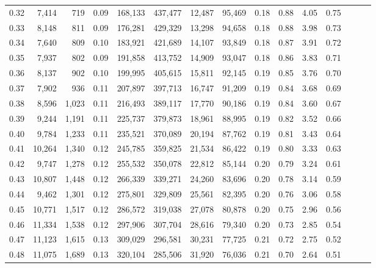 \begin{tabular}{rrrrrrrrrrrrrrr}
0.32 &   7,414 &    719 &  0.09 &  168,133 &  437,477 &   12,487 &   95,469 &  0.18 &  0.88 &  4.05 &      0.75 \\
0.33 &   8,148 &    811 &  0.09 &  176,281 &  429,329 &   13,298 &   94,658 &  0.18 &  0.88 &  3.98 &      0.73 \\
0.34 &   7,640 &    809 &  0.10 &  183,921 &  421,689 &   14,107 &   93,849 &  0.18 &  0.87 &  3.91 &      0.72 \\
0.35 &   7,937 &    802 &  0.09 &  191,858 &  413,752 &   14,909 &   93,047 &  0.18 &  0.86 &  3.83 &      0.71 \\
0.36 &   8,137 &    902 &  0.10 &  199,995 &  405,615 &   15,811 &   92,145 &  0.19 &  0.85 &  3.76 &      0.70 \\
0.37 &   7,902 &    936 &  0.11 &  207,897 &  397,713 &   16,747 &   91,209 &  0.19 &  0.84 &  3.68 &      0.69 \\
0.38 &   8,596 &  1,023 &  0.11 &  216,493 &  389,117 &   17,770 &   90,186 &  0.19 &  0.84 &  3.60 &      0.67 \\
0.39 &   9,244 &  1,191 &  0.11 &  225,737 &  379,873 &   18,961 &   88,995 &  0.19 &  0.82 &  3.52 &      0.66 \\
0.40 &   9,784 &  1,233 &  0.11 &  235,521 &  370,089 &   20,194 &   87,762 &  0.19 &  0.81 &  3.43 &      0.64 \\
0.41 &  10,264 &  1,340 &  0.12 &  245,785 &  359,825 &   21,534 &   86,422 &  0.19 &  0.80 &  3.33 &      0.63 \\
0.42 &   9,747 &  1,278 &  0.12 &  255,532 &  350,078 &   22,812 &   85,144 &  0.20 &  0.79 &  3.24 &      0.61 \\
0.43 &  10,807 &  1,448 &  0.12 &  266,339 &  339,271 &   24,260 &   83,696 &  0.20 &  0.78 &  3.14 &      0.59 \\
0.44 &   9,462 &  1,301 &  0.12 &  275,801 &  329,809 &   25,561 &   82,395 &  0.20 &  0.76 &  3.06 &      0.58 \\
0.45 &  10,771 &  1,517 &  0.12 &  286,572 &  319,038 &   27,078 &   80,878 &  0.20 &  0.75 &  2.96 &      0.56 \\
0.46 &  11,334 &  1,538 &  0.12 &  297,906 &  307,704 &   28,616 &   79,340 &  0.20 &  0.73 &  2.85 &      0.54 \\
0.47 &  11,123 &  1,615 &  0.13 &  309,029 &  296,581 &   30,231 &   77,725 &  0.21 &  0.72 &  2.75 &      0.52 \\
0.48 &  11,075 &  1,689 &  0.13 &  320,104 &  285,506 &   31,920 &   76,036 &  0.21 &  0.70 &  2.64 &      0.51 \\

\end{tabular}
